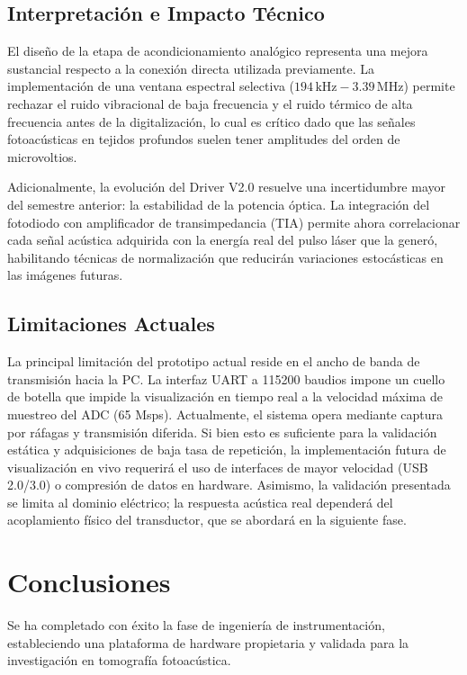 \documentclass[12pt,letterpaper]{article}
\begin{document}
\subsection{Interpretación e Impacto Técnico}
El diseño de la etapa de acondicionamiento analógico representa una mejora sustancial respecto a la conexión directa utilizada previamente. La implementación de una ventana espectral selectiva ($194\,\text{kHz} - 3.39\,\text{MHz}$) permite rechazar el ruido vibracional de baja frecuencia y el ruido térmico de alta frecuencia antes de la digitalización, lo cual es crítico dado que las señales fotoacústicas en tejidos profundos suelen tener amplitudes del orden de microvoltios.

Adicionalmente, la evolución del Driver V2.0 resuelve una incertidumbre mayor del semestre anterior: la estabilidad de la potencia óptica. La integración del fotodiodo con amplificador de transimpedancia (TIA) permite ahora correlacionar cada señal acústica adquirida con la energía real del pulso láser que la generó, habilitando técnicas de normalización que reducirán variaciones estocásticas en las imágenes futuras.

\subsection{Limitaciones Actuales}
La principal limitación del prototipo actual reside en el ancho de banda de transmisión hacia la PC. La interfaz UART a 115200 baudios impone un cuello de botella que impide la visualización en tiempo real a la velocidad máxima de muestreo del ADC (65 Msps). Actualmente, el sistema opera mediante captura por ráfagas y transmisión diferida. Si bien esto es suficiente para la validación estática y adquisiciones de baja tasa de repetición, la implementación futura de visualización en vivo requerirá el uso de interfaces de mayor velocidad (USB 2.0/3.0) o compresión de datos en hardware. Asimismo, la validación presentada se limita al dominio eléctrico; la respuesta acústica real dependerá del acoplamiento físico del transductor, que se abordará en la siguiente fase.

\section{Conclusiones}

Se ha completado con éxito la fase de ingeniería de instrumentación, estableciendo una plataforma de hardware propietaria y validada para la investigación en tomografía fotoacústica.
\end{document}
